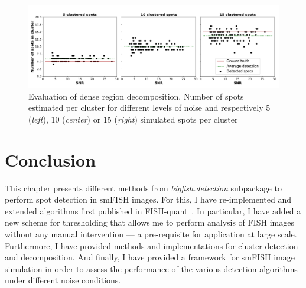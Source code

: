 
\begin{figure}[]
    \centering
    \includegraphics[width=1\textwidth]{figures/chapter2/cluster_along_noise}
    \caption[Evaluation of dense region decomposition]{Evaluation of dense region decomposition.
	 Number of spots estimated per cluster for different levels of noise and respectively 5 (\textit{left}), 10 (\textit{center}) or 15 (\textit{right}) simulated spots per cluster}
    \label{fig:cluster_results}
\end{figure}

\section{Conclusion}
\label{sec:detection_conclusion}

This chapter presents different methods from \emph{bigfish.detection} subpackage to perform spot detection in \ac{smFISH} images.
For this, I have re-implemented and extended algorithms first published in FISH-quant~\cite{mueller_fish-quant_2013}.
In particular, I have added a new scheme for thresholding that allows me to perform analysis of \ac{FISH} images without any manual intervention --- a pre-requisite for application at large scale.
Furthermore, I have provided methods and implementations for cluster detection and decomposition.
And finally, I have provided a framework for \ac{smFISH} image simulation in order to assess the performance of the various detection algorithms under different noise conditions.

